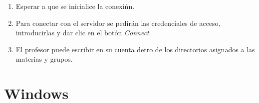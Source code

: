 {\begin{enumerate}

  \item Esperar a que se inicialice la conexi\'{n}n.


  \item Para conectar con el servidor se pedir\'{a}n las credenciales de acceso, introducirlas y dar clic en el bot\'{o}n \textsl{Connect}.


  \item El profesor puede escribir en su cuenta detro de los directorios asignados a las materias y grupos.


\end{enumerate}
}

    \section {Windows}

%

